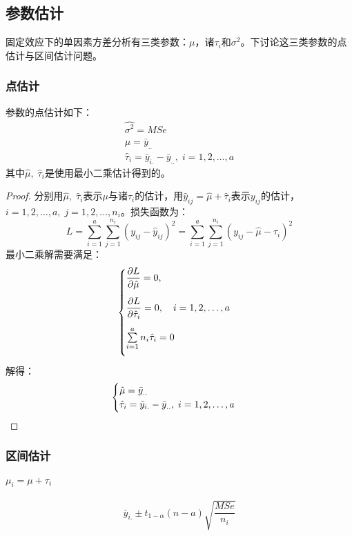 \subsection{参数估计}
固定效应下的单因素方差分析有三类参数：$\mu$，诸$\tau_i$和$\sigma^2$。下讨论这三类参数的点估计与区间估计问题。
\subsubsection{点估计}
参数的点估计如下：
\begin{gather*}
	\hat{\sigma^2}=MSe \\
	\hat{\mu}=\bar{y}_{..} \\
	\hat{\tau}_i=\bar{y}_{i.}-\bar{y}_{..},\;i=1,2,\dots,a
\end{gather*}
其中$\hat{\mu},\;\hat{\tau}_i$是使用最小二乘估计得到的。
\begin{proof}
	分别用$\hat{\mu},\;\hat{\tau}_i$表示$\mu$与诸$\tau_i$的估计，用$\hat{y}_{ij}=\hat{\mu}+\hat{\tau}_i$表示$y_{ij}$的估计，$i=1,2,\dots,a,\;j=1,2,\dots,n_i$。损失函数为：
	\begin{equation*}
		L=\sum_{i=1}^a\sum_{j=1}^{n_i}(y_{ij}-\hat{y}_{ij})^2=\sum_{i=1}^a\sum_{j=1}^{n_i}(y_{ij}-\hat{\mu}-\hat{\tau}_i)^2
	\end{equation*}
	最小二乘解需要满足：
	\begin{equation*}
		\begin{cases}
			\vspace{2ex}
			\dfrac{\partial L}{\partial\hat{\mu}}=0, \\
			\vspace{2ex}
			\dfrac{\partial L}{\partial\hat{\tau}_i}=0,\quad
			i=1,2,\dots,a \\
			\vspace{2ex}
			\sum\limits_{i=1}^an_i\hat{\tau}_i=0
		\end{cases}
	\end{equation*}
	解得：
	\begin{equation*}
		\begin{cases}
			\hat{\mu}=\bar{y}_{..} \\
			\hat{\tau}_i=\bar{y}_{i.}-\bar{y}_{..},\;i=1,2,\dots,a
		\end{cases}
		\qedhere
	\end{equation*}
\end{proof}
\subsubsection{区间估计}
\paragraph{$\mu_i=\mu+\tau_i$}
\begin{equation*}
	\bar{y}_{i.}\pm t_{1-\alpha}(n-a)\sqrt{\frac{MSe}{n_i}}
\end{equation*}
